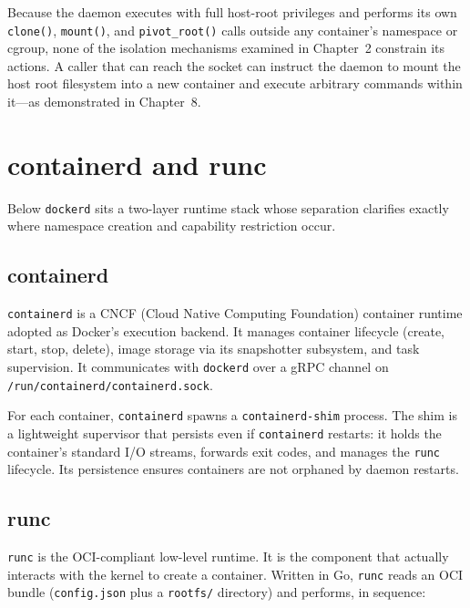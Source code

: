 Because the daemon executes with full host-root privileges and performs its own
\texttt{clone()}, \texttt{mount()}, and \texttt{pivot\_root()} calls outside any
container's namespace or cgroup, none of the isolation mechanisms examined in
Chapter~2 constrain its actions. A caller that can reach the socket can instruct the
daemon to mount the host root filesystem into a new container and execute arbitrary
commands within it---as demonstrated in Chapter~8.


\section{containerd and runc}

Below \texttt{dockerd} sits a two-layer runtime stack whose separation clarifies
exactly where namespace creation and capability restriction occur.

\subsection{containerd}

\texttt{containerd} is a CNCF (Cloud Native Computing Foundation) container runtime
adopted as Docker's execution backend. It manages container lifecycle (create, start,
stop, delete), image storage via its snapshotter subsystem, and task supervision. It
communicates with \texttt{dockerd} over a gRPC channel on
\texttt{/run/containerd/containerd.sock}.

For each container, \texttt{containerd} spawns a \texttt{containerd-shim} process.
The shim is a lightweight supervisor that persists even if \texttt{containerd}
restarts: it holds the container's standard I/O streams, forwards exit codes, and
manages the \texttt{runc} lifecycle. Its persistence ensures containers are not
orphaned by daemon restarts.

\subsection{runc}

\texttt{runc} is the OCI-compliant low-level runtime. It is the component that
actually interacts with the kernel to create a container. Written in Go, \texttt{runc}
reads an OCI bundle (\texttt{config.json} plus a \texttt{rootfs/} directory) and
performs, in sequence:

